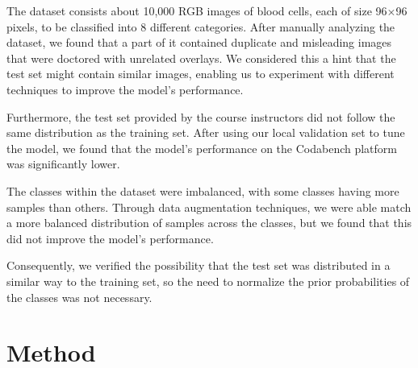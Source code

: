 \documentclass[11pt]{article}
\begin{document}
\begin{multicols}{2}

      The dataset consists about 10,000 RGB images of blood cells, each
      of size 96\(\times\)96 pixels, to be classified into 8 different
      categories. After manually analyzing the dataset, we found that
      a part of it contained duplicate and misleading images that were doctored
      with unrelated overlays. We considered this a hint that the test set
      might contain similar images, enabling us to experiment with different
      techniques to improve the model's performance.

      Furthermore, the test set provided by the course instructors did not
      follow the same distribution as the training set. After using our local
      validation set to tune the model, we found that the model's performance
      on the Codabench platform was significantly lower.

      The classes within the dataset were imbalanced, with some classes having
      more samples than others. Through data augmentation techniques, we were
      able match a more balanced distribution of samples across the classes,
      but we found that this did not improve the model's performance.

      Consequently, we verified the possibility that the test set was
      distributed in a similar way to the training set, so the need to
      normalize the prior probabilities of the classes was not necessary.

      \section{Method}



\end{multicols}
\end{document}
